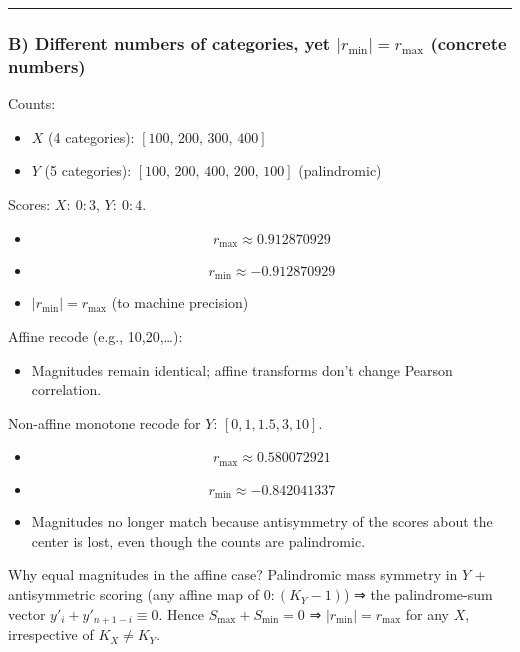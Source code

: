 \documentclass[
  12pt,
]{article}
\providecommand{\tightlist}{%
  \setlength{\itemsep}{0pt}\setlength{\parskip}{0pt}}
\theoremstyle{plain}
\theoremstyle{definition}
\theoremstyle{remark}
\begin{document}
\begin{center}\rule{0.5\linewidth}{0.5pt}\end{center}

\subsubsection{\texorpdfstring{B) Different numbers of categories, yet
\(|r_{\min}|=r_{\max}\) (concrete
numbers)}{B) Different numbers of categories, yet \textbar r\_\{\textbackslash min\}\textbar=r\_\{\textbackslash max\} (concrete numbers)}}\label{b-different-numbers-of-categories-yet-r_minr_max-concrete-numbers}

Counts:

\begin{itemize}
\item
  \(X\) (4 categories): \([100,\,200,\,300,\,400]\)
\item
  \(Y\) (5 categories): \([100,\,200,\,400,\,200,\,100]\) (palindromic)
\end{itemize}

Scores: \(X:\ 0{:}3\), \(Y:\ 0{:}4\).

\begin{itemize}
\item
  \[r_{\max}\approx 0.912870929\]
\item
  \[r_{\min}\approx -0.912870929\]
\item
  \(|r_{\min}| = r_{\max}\) (to machine precision)
\end{itemize}

Affine recode (e.g., 10,20,\ldots):

\begin{itemize}
\tightlist
\item
  Magnitudes remain identical; affine transforms don't change Pearson
  correlation.
\end{itemize}

Non-affine monotone recode for \(Y\): \([0,1,1.5,3,10]\).

\begin{itemize}
\item
  \[r_{\max}\approx 0.580072921\]
\item
  \[r_{\min}\approx -0.842041337\]
\item
  Magnitudes no longer match because antisymmetry of the scores about
  the center is lost, even though the counts are palindromic.
\end{itemize}

Why equal magnitudes in the affine case? Palindromic mass symmetry in
\(Y\) + antisymmetric scoring (any affine map of \(0{:}(K_Y-1)\)) ⇒ the
palindrome-sum vector \(y'_i+y'_{n+1-i}\equiv 0\). Hence
\(S_{\max}+S_{\min}=0\) ⇒ \(|r_{\min}|=r_{\max}\) for any \(X\),
irrespective of \(K_X\neq K_Y\).
\end{document}
